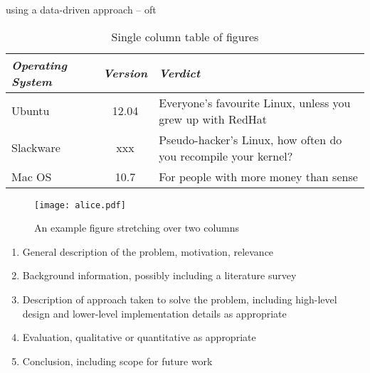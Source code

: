 using a data-driven approach -- oft



\begin{table}
\begin{tabular}{l||c||p{2cm}}
\emph{Operating System} & \emph{Version} & \emph{Verdict} \\ \hline \hline
Ubuntu & 12.04 & Everyone's favourite Linux, unless you grew up with
RedHat \\ \hline
Slackware & xxx & Pseudo-hacker's Linux, how often do you recompile
your kernel? \\ \hline
Mac OS & 10.7 & For people with more money than sense \\ \hline
\end{tabular}
\caption{\label{tab-eg}Single column table of figures}
\end{table}

\begin{figure*}
\begin{center}
\texttt{[image: alice.pdf]}
\end{center}
\caption{\label{fig-eg}An example figure stretching over two columns}
\end{figure*}

\begin{enumerate}
\item General description of the problem, motivation, relevance
\item Background information, possibly including a literature survey
\item Description of approach taken to solve the problem, including
  high-level design and lower-level implementation details as appropriate
\item Evaluation, qualitative or quantitative as appropriate
\item Conclusion, including scope for future work
\end{enumerate}

